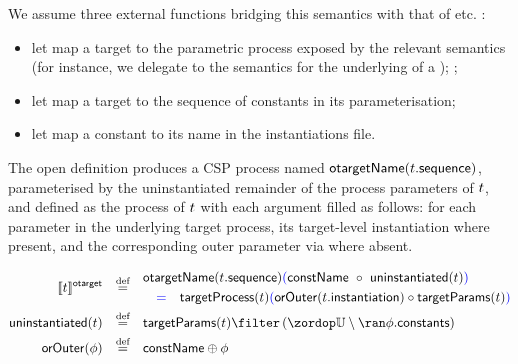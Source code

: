 We assume three external functions bridging this semantics with that of
\robochart{} etc. :

\begin{itemize}
\item
	let  map a target to the parametric
	process exposed by the relevant \tockcsp{} semantics (for instance,
	we delegate to the \robochart{} semantics for the underlying
	\mrcmodule{} of a \mrcmoduletarget);
	;
\item
	let  map a target to the sequence of
	constants in its parameterisation;
\item
	let  map a constant to its name in the \robochart{}
	instantiations file.
\end{itemize}

\begin{defn}

The open definition produces a CSP process named
\(\mathsf{otargetName}(t.\mathsf{sequence})\), parameterised by the
uninstantiated remainder of the process parameters of \(t\), and
defined as the process of \(t\) with each argument filled as follows:
for each parameter in the underlying target process, its
target-level instantiation where present, and the corresponding outer
parameter via  where absent.

%
\begin{align*}
	\otargetsema{\atarget}
\quad\defeq\quad&
\begin{aligned}
&
	\otargetnameOf{\field{\atarget}{sequence}}
	\tlang{
	\left(
		\olang{\funcname{constName}\ \circ\ \funcname{uninstantiated}(\atarget)}
	\right)
	}
\\
&
	\tlang{\quad=\quad}
	\funcname{targetProcess}(\atarget)
	\tlang{
	\left(
	\olang{
	\funcname{orOuter}(\field{\atarget}{instantiation})
	\circ
	\funcname{targetParams}(\atarget)
	}
	\right)
	}
\end{aligned}
\\
	\funcname{uninstantiated}(\atarget)
\quad\defeq\quad&
	\funcname{targetParams}(\atarget)
	\filter
	\left(\universe \setminus \ran \field{\aninst}{constants}\right)
\\
	\funcname{orOuter}(\aninst)
\quad\defeq\quad&
	\funcname{constName} \oplus \aninst
\end{align*}
\end{defn}

